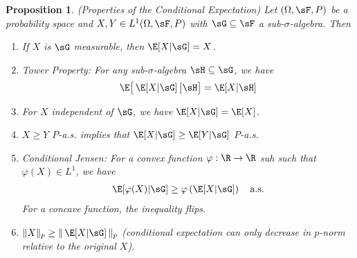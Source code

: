 \documentclass[12pt]{article}
\theoremstyle{plain}
\newtheorem{prop}[thm]{Proposition}
\theoremstyle{definition}
\theoremstyle{remark}
\newcommand{\ra}{\rightarrow}
\begin{document}
\begin{prop}\emph{(Properties of the Conditional Expectation)}
Let $(\Omega,\sF,P)$ be a probability space and
$X,Y\in L^1(\Omega,\sF,P)$ with $\sG\subseteq\sF$ a
sub-$\sigma$-algebra. Then
\begin{enumerate}[label=(\roman*)]
  \item If $X$ is $\sG$ measurable, then $\E[X|\sG]=X$.
  \item Tower Property: For any sub-$\sigma$-algebra $\sH\subseteq\sG$,
    we have
    \begin{align*}
      \E\big[
        \,\E[X|\sG]\,
        \big|
        \sH
      \big]
      = \E[X|\sH]
    \end{align*}

  \item For $X$ independent of $\sG$, we have $\E[X|\sG]=\E[X]$.

  \item $X \geq Y$ $P$-a.s. implies that $\E[X|\sG]\geq\E[Y|\sG]$
    $P$-a.s.
  \item Conditional Jensen: For a convex function $\varphi:\R\ra \R$ suh
    such that $\varphi(X)\in L^1$, we have
    \begin{align*}
      \E[ \varphi(X) |\sG]
      \geq \varphi\left(\E[X|\sG]\right)
      \quad \text{a.s.}
    \end{align*}
    For a concave function, the inequality flips.

  \item $\lVert X\rVert_p\geq \lVert\,\E[X|\sG]\,\rVert_p$ (conditional
    expectation can only decrease in $p$-norm relative to the original
    $X$).
\end{enumerate}
\end{prop}
\end{document}
